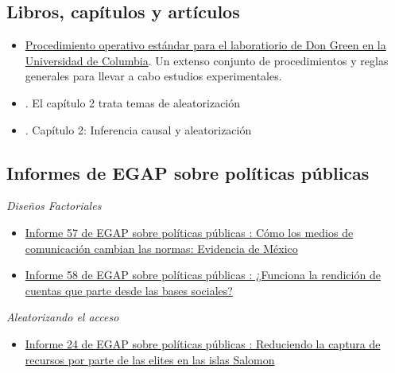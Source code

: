 \documentclass[12pt,spanish,]{book}
\providecommand{\tightlist}{%
  \setlength{\itemsep}{0pt}\setlength{\parskip}{0pt}}
\begin{document}
\hypertarget{libros-capuxedtulos-y-artuxedculos-1}{%
\subsection{Libros, capítulos y artículos}\label{libros-capuxedtulos-y-artuxedculos-1}}

\begin{itemize}
\item
  \href{https://github.com/acoppock/Green-Lab-SOP}{Procedimiento operativo estándar para el laboratiorio de Don Green en la Universidad de Columbia}. Un extenso conjunto de procedimientos y reglas generales para llevar a cabo estudios experimentales.
\item
  \autocite{glennerster_running_2013}. El capítulo 2 trata temas de aleatorización
\item
  \autocite{gerber_field_2012}. Capítulo 2: Inferencia causal y aleatorización
\end{itemize}

\hypertarget{informes-de-egap-sobre-poluxedticas-puxfablicas-1}{%
\subsection{Informes de EGAP sobre políticas públicas}\label{informes-de-egap-sobre-poluxedticas-puxfablicas-1}}

\emph{Diseños Factoriales}

\begin{itemize}
\item
  \href{https://egap.org/resource/how-media-influence-social-norms-evidence-from-mexico/}{Informe 57 de EGAP sobre políticas públicas : Cómo los medios de comunicación cambian las normas: Evidencia de México}
\item
  \href{https://egap.org/resource/does-bottom-up-accountability-work-evidence-from-uganda/}{Informe 58 de EGAP sobre políticas públicas : ¿Funciona la rendición de cuentas que parte desde las bases sociales?}
\end{itemize}

\emph{Aleatorizando el acceso}

\begin{itemize}
\tightlist
\item
  \href{https://egap.org/resource/brief-24-reducing-elite-capture-in-the-solomon-islands/}{Informe 24 de EGAP sobre políticas públicas : Reduciendo la captura de recursos por parte de las elites en las islas Salomon}
\end{itemize}
\end{document}
